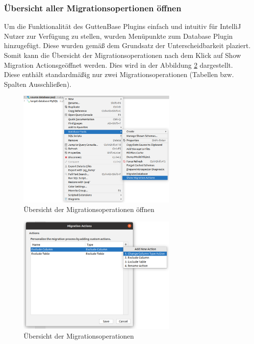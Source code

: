 \subsubsection{Übersicht aller Migrationsopertionen öffnen}
Um die Funktionalität des GuttenBase Plugins einfach und intuitiv für IntelliJ Nutzer zur Verfügung zu stellen, wurden Menüpunkte zum Database Plugin hinzugefügt. Diese wurden gemäß dem Grundsatz der Unterscheidbarkeit plaziert. Somit kann die Übersicht der Migrationsoperationen nach dem Klick auf \glqq Show Migration Actions\grqq geöffnet werden. Dies wird in der Abbildung \ref{img:creategbaction} dargestellt. Diese enthält standardmäßig nur zwei Migrationsoperationen (Tabellen bzw. Spalten Ausschließen).\\ 
\begin{figure}[h]
	\centering
	\includegraphics[width=0.7\textwidth]{images/ui/dbactions}
	\caption{Übersicht der Migrationsoperationen öffnen}
	\label{img:dbactions}
\end{figure}
\begin{figure}[H]
	\centering
	\includegraphics[width=0.7\textwidth]{images/ui/creategbaction}
	\caption{Übersicht der Migrationsoperationen}
	\label{img:creategbaction}
\end{figure}

